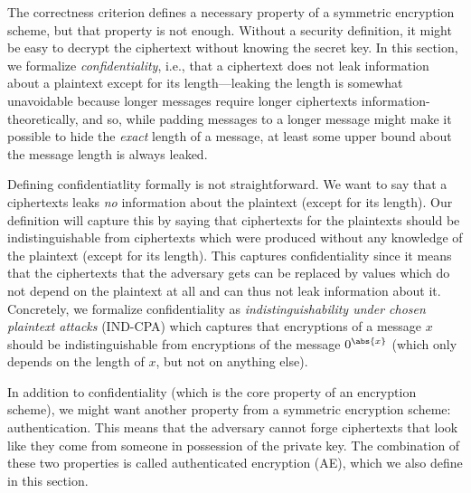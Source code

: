 \begin{remark}\label{rmk:IND-CPA}
	The correctness criterion defines a necessary property of a symmetric encryption scheme, but that property is not enough. Without a security definition, it might be easy to decrypt the ciphertext without knowing the secret key. In this section, we formalize \emph{confidentiality},
	i.e., that a ciphertext does not leak information about a plaintext except for its length---leaking the length is somewhat unavoidable because
	longer messages require longer ciphertexts information-theoretically, and so, while padding messages to a longer message might make it
	possible to hide the \emph{exact} length of a message, at least some upper bound about the message length is always leaked.

	Defining confidentiatlity formally is not straightforward. We want to say that a ciphertexts leaks \emph{no} information about the plaintext
	(except for its length). Our definition will capture this by saying that ciphertexts for the plaintexts should be indistinguishable from ciphertexts which were produced without any knowledge of the plaintext (except for its length). This captures confidentiality since it means that the ciphertexts that the adversary gets can be replaced by values which do not depend on the plaintext at all and can thus not leak information about it. Concretely, we formalize confidentiality as \emph{indistinguishability under chosen plaintext attacks} (IND-CPA) which captures that encryptions of a message $x$ should be indistinguishable from encryptions of the message $0^{\abs{x}}$ (which only depends on the length of $x$, but not on anything else).
	
	In addition to confidentiality (which is the core property of an encryption scheme), we might want another property from a symmetric encryption scheme: authentication. This means that the adversary cannot forge ciphertexts that look like they come from someone in possession of the private key. The combination of these two properties is called authenticated encryption (AE), which we also define in this section.
\end{remark}


